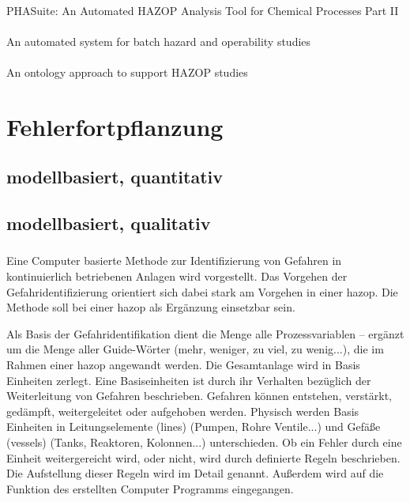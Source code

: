 \paragraph{\cite{Zhao_2005a}} {PHASuite}: An Automated {HAZOP} Analysis Tool for Chemical Processes Part II

\paragraph*{\cite{Palmer_2009}} An automated system for batch hazard and operability studies

\paragraph*{\cite{Batres_2004}} An ontology approach to support HAZOP studies

\section{Fehlerfortpflanzung}
\subsection{modellbasiert, quantitativ}
\subsection{modellbasiert, qualitativ}
\subsubsection{\cite{Parmar_1987}} Eine Computer basierte Methode zur Identifizierung von Gefahren in kontinuierlich betriebenen Anlagen wird vorgestellt. Das Vorgehen der Gefahridentifizierung orientiert sich dabei stark am Vorgehen in einer \ac{hazop}. Die Methode soll bei einer \ac{hazop} als Erg\"anzung einsetzbar sein. 

Als Basis der Gefahridentifikation dient die Menge alle Prozessvariablen -- erg\"anzt um die Menge aller Guide-W\"orter (mehr, weniger, zu viel, zu wenig...), die im Rahmen einer \ac{hazop} angewandt werden. Die Gesamtanlage wird in Basis Einheiten zerlegt. Eine Basiseinheiten ist durch ihr Verhalten bez\"uglich der Weiterleitung von Gefahren beschrieben. Gefahren k\"onnen entstehen, verst\"arkt, ged\"ampft, weitergeleitet oder aufgehoben werden. Physisch werden Basis Einheiten in Leitungselemente (\glqq lines\grqq { }) (Pumpen, Rohre Ventile...) und Gef\"a\ss{}e (\glqq vessels\grqq { }) (Tanks, Reaktoren, Kolonnen...) unterschieden. Ob ein Fehler durch eine Einheit weitergereicht wird, oder nicht, wird durch definierte Regeln beschrieben. Die Aufstellung dieser Regeln wird im Detail genannt. Au\ss{}erdem wird auf die Funktion des erstellten Computer Programms eingegangen. 

